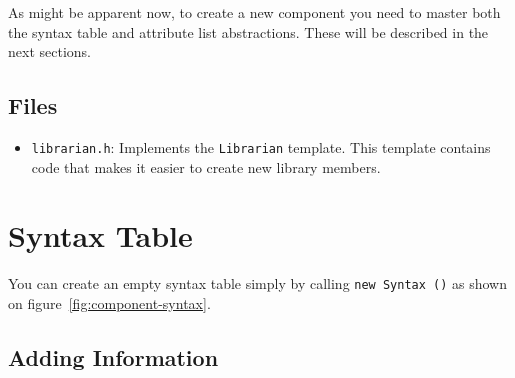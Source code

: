 \documentclass{article}
\newcommand{\code}[1]{\texttt{#1}}
\newcommand{\file}[1]{\texttt{#1}}
\begin{document}
As might be apparent now, to create a new component you need to master
both the syntax table and attribute list abstractions.  These will be
described in the next sections.

\subsection{Files}

\begin{itemize}
\item \file{librarian.h}: Implements the \code{Librarian} template.
  This template contains code that makes it easier to create new
  library members.
\end{itemize}

\section{Syntax Table}
\label{sec:syntax}

You can create an empty syntax table simply by calling
\code{new~Syntax~()} as shown on figure~\ref{fig:component-syntax}.

\subsection{Adding Information}
\label{sec:syntax-add}
\end{document}
